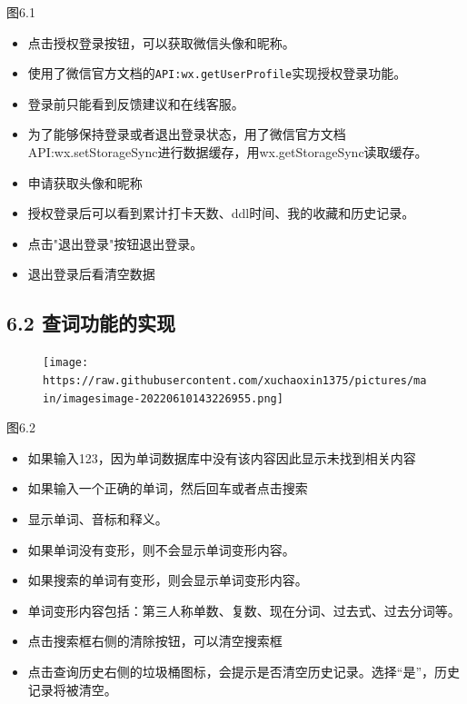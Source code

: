 \documentclass[
]{article}
\begin{document}
图6.1

\begin{itemize}
\item
  点击授权登录按钮，可以获取微信头像和昵称。
\item
  使用了微信官方文档的\texttt{API:wx.getUserProfile}实现授权登录功能。
\item
  登录前只能看到反馈建议和在线客服。
\item
  为了能够保持登录或者退出登录状态，用了微信官方文档API:wx.setStorageSync进行数据缓存，用wx.getStorageSync读取缓存。
\item
  申请获取头像和昵称
\item
  授权登录后可以看到累计打卡天数、ddl时间、我的收藏和历史记录。
\item
  点击"退出登录"按钮退出登录。
\item
  退出登录后看清空数据
\end{itemize}

\hypertarget{62-ux67e5ux8bcdux529fux80fdux7684ux5b9eux73b0}{%
\subsection{6.2
查词功能的实现}\label{62-ux67e5ux8bcdux529fux80fdux7684ux5b9eux73b0}}

\begin{figure}
\centering
\texttt{[image: https://raw.githubusercontent.com/xuchaoxin1375/pictures/main/imagesimage-20220610143226955.png]}
\caption{}
\end{figure}

图6.2

\begin{itemize}
\item
  如果输入123，因为单词数据库中没有该内容因此显示未找到相关内容
\item
  如果输入一个正确的单词，然后回车或者点击搜索
\item
  显示单词、音标和释义。
\item
  如果单词没有变形，则不会显示单词变形内容。
\item
  如果搜索的单词有变形，则会显示单词变形内容。
\item
  单词变形内容包括：第三人称单数、复数、现在分词、过去式、过去分词等。
\item
  点击搜索框右侧的清除按钮，可以清空搜索框
\item
  点击查询历史右侧的垃圾桶图标，会提示是否清空历史记录。选择``是''，历史记录将被清空。
\end{itemize}
\end{document}
